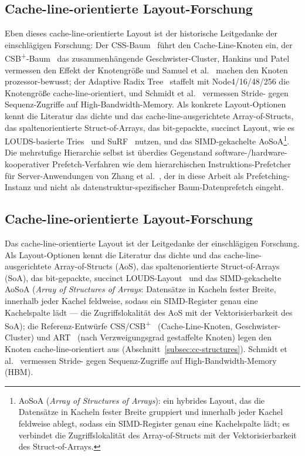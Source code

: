 \begin{nurlang}
\subsection{Cache-line-orientierte Layout-Forschung}\label{subsec:layout-research}
Eben dieses cache-line-orientierte Layout ist der historische Leitgedanke der einschlägigen Forschung:
Der CSS-Baum~\cite{rao1999css} führt den Cache-Line-Knoten ein, der
CSB\textsuperscript{+}-Baum~\cite{rao2000csb} das zusammenhängende Geschwister-Cluster, Hankins und
Patel~\cite{hankins2003nodesize} vermessen den Effekt der Knotengröße und Samuel et
al.~\cite{samuel2005procaware} machen den Knoten prozessor-bewusst; der Adaptive Radix
Tree~\cite{leis2013art} staffelt mit Node4/16/48/256 die Knotengröße cache-line-orientiert, und Schmidt et
al.~\cite{schmidt2025hbm} vermessen Stride- gegen Sequenz-Zugriffe auf High-Bandwidth-Memory. Als
konkrete Layout-Optionen kennt die Literatur das dichte und das cache-line-ausgerichtete Array-of-Structs,
das spaltenorientierte Struct-of-Arrays, das bit-gepackte, succinct Layout, wie es LOUDS-basierte
Tries~\cite{jacobson1989louds} und SuRF~\cite{zhang2018surf} nutzen, und das SIMD-gekachelte
AoSoA\footnote{AoSoA (\emph{Array of Structures of Arrays}): ein hybrides Layout, das die Datensätze in
Kacheln fester Breite gruppiert und innerhalb jeder Kachel feldweise ablegt, sodass ein SIMD-Register
genau eine Kachelspalte lädt; es verbindet die Zugriffslokalität des Array-of-Structs mit der
Vektorisierbarkeit des Struct-of-Arrays.}. Die mehrstufige Hierarchie selbst ist überdies Gegenstand
software-/hardware-kooperativer Prefetch-Verfahren wie dem hierarchischen Instruktions-Prefetcher für
Server-Anwendungen von
Zhang et al.~\cite{zhang2025hierarchical}, der in diese Arbeit als Prefetching-Instanz und nicht als
datenstruktur-spezifischer Baum-Datenprefetch eingeht.
\end{nurlang}
\begin{nurkurz}
\subsection{Cache-line-orientierte Layout-Forschung}\label{subsec:layout-research}
Das cache-line-orientierte Layout ist der Leitgedanke der einschlägigen Forschung. Als Layout-Optionen kennt die
Literatur das dichte und das cache-line-ausgerichtete Array-of-Structs (AoS), das spaltenorientierte
Struct-of-Arrays (SoA), das bit-gepackte, succinct LOUDS-Layout~\cite{jacobson1989louds,zhang2018surf} und das
SIMD-gekachelte AoSoA (\emph{Array of Structures of Arrays}: Datensätze in Kacheln fester Breite, innerhalb jeder
Kachel feldweise, sodass ein SIMD-Register genau eine Kachelspalte lädt --- die Zugriffslokalität des AoS mit der
Vektorisierbarkeit des SoA); die Referenz-Entwürfe CSS/CSB\textsuperscript{+}~\cite{rao1999css,rao2000csb}
(Cache-Line-Knoten, Geschwister-Cluster) und ART~\cite{leis2013art} (nach Verzweigungsgrad gestaffelte Knoten) legen
den Knoten cache-line-orientiert aus (Abschnitt~\ref{subsec:cc-structures}). Schmidt et al.~\cite{schmidt2025hbm}
vermessen Stride- gegen Sequenz-Zugriffe auf High-Bandwidth-Memory (HBM).
\end{nurkurz}

